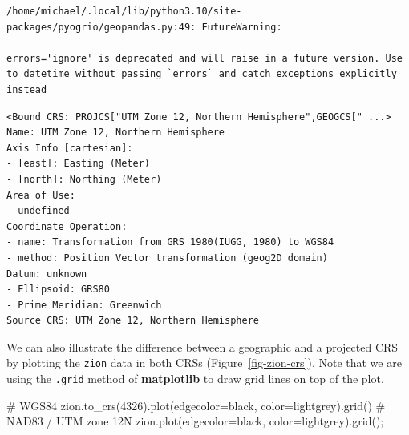 \documentclass[
  letterpaper,
]{krantz}
\newenvironment{Shaded}{\begin{snugshade}}{\end{snugshade}}
\newcommand{\CommentTok}[1]{\textcolor[rgb]{0.37,0.37,0.37}{#1}}
\newcommand{\DecValTok}[1]{\textcolor[rgb]{0.68,0.00,0.00}{#1}}
\newcommand{\NormalTok}[1]{\textcolor[rgb]{0.00,0.23,0.31}{#1}}
\newcommand{\OperatorTok}[1]{\textcolor[rgb]{0.37,0.37,0.37}{#1}}
\newcommand{\StringTok}[1]{\textcolor[rgb]{0.13,0.47,0.30}{#1}}
\begin{document}
\begin{verbatim}
/home/michael/.local/lib/python3.10/site-packages/pyogrio/geopandas.py:49: FutureWarning:

errors='ignore' is deprecated and will raise in a future version. Use to_datetime without passing `errors` and catch exceptions explicitly instead
\end{verbatim}

\begin{verbatim}
<Bound CRS: PROJCS["UTM Zone 12, Northern Hemisphere",GEOGCS[" ...>
Name: UTM Zone 12, Northern Hemisphere
Axis Info [cartesian]:
- [east]: Easting (Meter)
- [north]: Northing (Meter)
Area of Use:
- undefined
Coordinate Operation:
- name: Transformation from GRS 1980(IUGG, 1980) to WGS84
- method: Position Vector transformation (geog2D domain)
Datum: unknown
- Ellipsoid: GRS80
- Prime Meridian: Greenwich
Source CRS: UTM Zone 12, Northern Hemisphere
\end{verbatim}

We can also illustrate the difference between a geographic and a
projected CRS by plotting the \texttt{zion} data in both CRSs
(Figure~\ref{fig-zion-crs}). Note that we are using the \texttt{.grid}
method of \textbf{matplotlib} to draw grid lines on top of the plot.

\begin{Shaded}
\begin{Highlighting}[]
\CommentTok{\# WGS84}
\NormalTok{zion.to\_crs(}\DecValTok{4326}\NormalTok{).plot(edgecolor}\OperatorTok{=}\StringTok{\textquotesingle{}black\textquotesingle{}}\NormalTok{, color}\OperatorTok{=}\StringTok{\textquotesingle{}lightgrey\textquotesingle{}}\NormalTok{).grid()}
\CommentTok{\# NAD83 / UTM zone 12N}
\NormalTok{zion.plot(edgecolor}\OperatorTok{=}\StringTok{\textquotesingle{}black\textquotesingle{}}\NormalTok{, color}\OperatorTok{=}\StringTok{\textquotesingle{}lightgrey\textquotesingle{}}\NormalTok{).grid()}\OperatorTok{;}
\end{Highlighting}
\end{Shaded}
\end{document}
